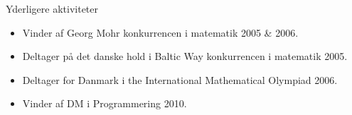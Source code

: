 \documentclass[11pt,oneside]{article}
\newenvironment{ressection}[1]{
	\vspace{4pt}
	{\fontfamily{phv}\selectfont\Large#1}
	\begin{itemize}
	\vspace{3pt}
}{
	\end{itemize}
}
\newcommand{\resitem}[1]{
	\vspace{-4pt}
	\item \begin{flushleft} #1 \end{flushleft}
}
\begin{document}

\begin{ressection}{Yderligere aktiviteter}

	\resitem{Vinder af Georg Mohr konkurrencen i matematik 2005 \& 2006.}
	
	\resitem{Deltager på det danske hold i Baltic Way konkurrencen i matematik 2005.}
	
	\resitem{Deltager for Danmark i the International Mathematical Olympiad 2006.}

    \resitem{Vinder af DM i Programmering 2010.}

\end{ressection}
\end{document}
